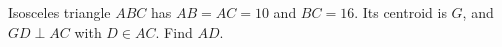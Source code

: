 Isosceles triangle $ABC$ has $AB=AC=10$ and $BC=16$. Its centroid is $G$, and $GD\perp AC$ with $D\in AC$. Find $AD$.
